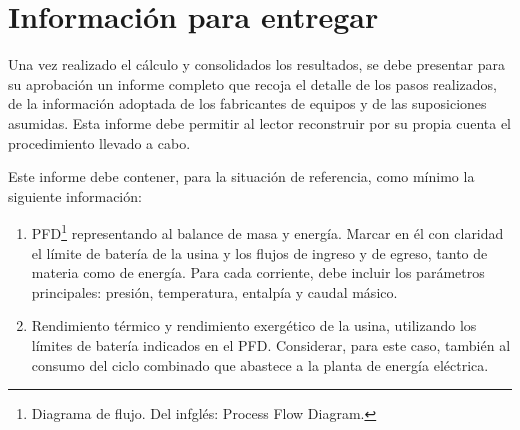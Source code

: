 \section{Información para entregar}\label{sec:Info}

Una vez realizado el cálculo y consolidados los resultados, se debe presentar para su aprobación un informe completo que recoja el detalle de los pasos realizados, de la información adoptada de los fabricantes de equipos y de las suposiciones asumidas. Esta informe debe permitir al lector reconstruir por su propia cuenta el procedimiento llevado a cabo.

Este informe debe contener, para la situación de referencia, como mínimo la siguiente información:
\begin{enumerate}
    \item PFD\footnote{Diagrama de flujo. Del infglés: Process Flow Diagram.} representando al balance de masa y energía. Marcar en él con claridad el límite de batería de la usina y los flujos de ingreso y de egreso, tanto de materia como de energía. Para cada corriente, debe incluir los parámetros principales: presión, temperatura, entalpía y caudal másico.
    \item Rendimiento térmico y rendimiento exergético de la usina, utilizando los límites de batería indicados en el PFD. Considerar, para este caso, también al consumo del ciclo combinado que abastece a la planta de energía eléctrica.
\end{enumerate}

